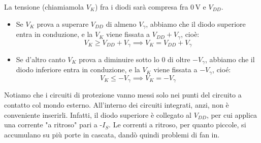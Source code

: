 \documentclass[a4paper,11pt]{article}
\begin{document}
La tensione (chiamiamola $V_K$) fra i diodi sarà compresa fra $0 \, \mathrm{V}$ e $V_{DD}$.
\begin{itemize}
	\item  Se $V_K$ prova a superare $V_{DD}$ di almeno $V_\gamma$, abbiamo che il diodo superiore entra in conduzione, e la $V_K$ viene fissata a $V_{DD} + V_\gamma$, cioè:
$$
V_K \geq V_{DD} + V_\gamma \implies V_K = V_{DD} + V_\gamma
$$
	\item Se d'altro canto $V_K$ prova a diminuire sotto lo $0$ di oltre $-V_\gamma$, abbiamo che il diodo inferiore entra in conduzione, e la $V_K$ viene fissata a $-V_\gamma$, cioé:
$$
V_K \leq - V_\gamma \implies V_K = - V_\gamma
$$
\end{itemize}

Notiamo che i circuiti di protezione vanno messi solo nei punti del circuito a contatto col mondo esterno. All'interno dei circuiti integrati, anzi, non è conveniente inserirli. Infatti, il diodo superiore è collegato al $V_{DD}$, per cui applica una corrente "a ritroso" pari a -$I_S$. Le correnti a ritroso, per quanto piccole, si accumulano su più porte in cascata, dandò quindi problemi di fan in.
\end{document}
